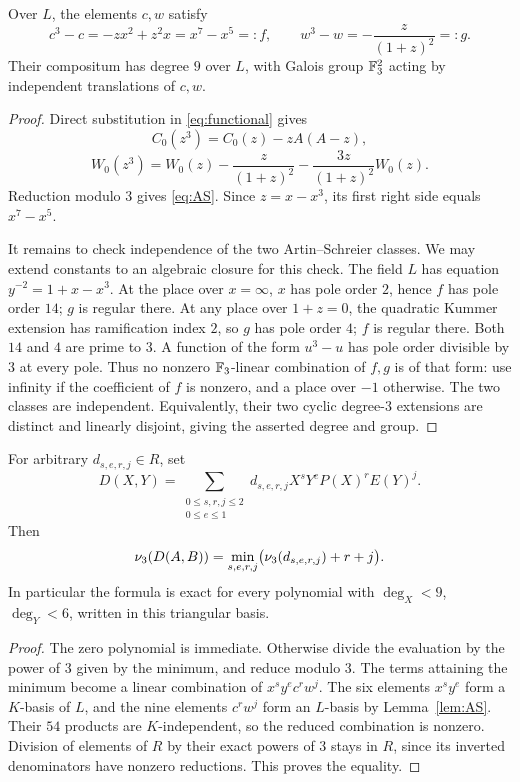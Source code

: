 \begin{lemma}\label{lem:AS}
Over $L$, the elements $c,w$ satisfy
\begin{equation}\label{eq:AS}
 c^3-c=-zx^2+z^2x=x^7-x^5=:f,
 \qquad w^3-w=-\frac{z}{(1+z)^2}=:g.
\end{equation}
Their compositum has degree $9$ over $L$, with Galois group $\mathbb F_3^2$
acting by independent translations of $c,w$.
\end{lemma}
\begin{proof}
Direct substitution in \eqref{eq:functional} gives
\[
 C_0(z^3)=C_0(z)-zA(A-z),
\]
\[
 W_0(z^3)=W_0(z)-\frac{z}{(1+z)^2}
                  -\frac{3z}{(1+z)^2}W_0(z).
\]
Reduction modulo $3$ gives \eqref{eq:AS}. Since $z=x-x^3$, its first
right side equals $x^7-x^5$.

It remains to check independence of the two Artin--Schreier classes.
We may extend constants to an algebraic closure for this check.
The field $L$ has equation $y^{-2}=1+x-x^3$. At the place over
$x=\infty$, $x$ has pole order $2$, hence $f$ has pole order $14$;
$g$ is regular there. At any place over $1+z=0$, the quadratic Kummer
extension has ramification index $2$, so $g$ has pole order $4$;
$f$ is regular there. Both $14$ and $4$ are prime to $3$.
A function of the form $u^3-u$ has pole order divisible by $3$ at every
pole. Thus no nonzero $\mathbb F_3$-linear combination of $f,g$ is of that
form: use infinity if the coefficient of $f$ is nonzero, and a place
over $-1$ otherwise. The two classes are independent. Equivalently,
their two cyclic degree-$3$ extensions are distinct and linearly
disjoint, giving the asserted degree and group.
\end{proof}

\begin{lemma}\label{lem:box}
For arbitrary $d_{s,e,r,j}\in R$, set
\[
 D(X,Y)=\sum_{\substack{0\le s,r,j\le2\\0\le e\le1}}
 d_{s,e,r,j}X^sY^eP(X)^rE(Y)^j.
\]
Then
\begin{equation}\label{eq:boxval}
 \nu_3(D(A,B))=
 \min_{s,e,r,j}\bigl(\nu_3(d_{s,e,r,j})+r+j\bigr).
\end{equation}
In particular the formula is exact for every polynomial with
$\deg_X<9$, $\deg_Y<6$, written in this triangular basis.
\end{lemma}
\begin{proof}
The zero polynomial is immediate. Otherwise divide the evaluation by
the power of $3$ given by the minimum, and
reduce modulo $3$. The terms attaining the minimum become a linear
combination of $x^sy^ec^rw^j$. The six elements $x^sy^e$ form a
$K$-basis of $L$, and the nine elements $c^rw^j$ form an $L$-basis
by Lemma~\ref{lem:AS}. Their $54$ products are $K$-independent,
so the reduced combination is nonzero. Division of elements of $R$
by their exact powers of $3$ stays in $R$, since its inverted
denominators have nonzero reductions. This proves the equality.
\end{proof}

